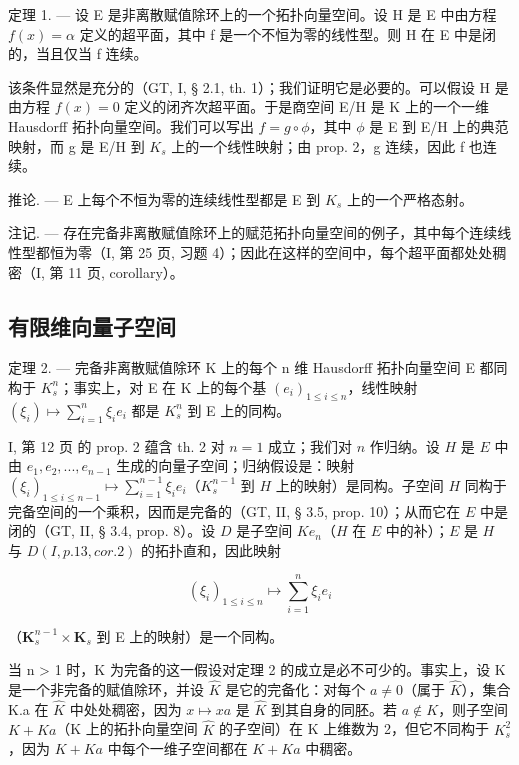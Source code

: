 定理 1. --- 设 E 是非离散赋值除环上的一个拓扑向量空间。设 H 是 E 中由方程 \(f(x) = \alpha\) 定义的超平面，其中 f 是一个不恒为零的线性型。则 H 在 E 中是闭的，当且仅当 f 连续。

该条件显然是充分的（GT, I, § 2.1, th. 1）；我们证明它是必要的。可以假设 H 是由方程 \(f(x) = 0\) 定义的闭齐次超平面。于是商空间 E/H 是 K 上的一个一维 Hausdorff 拓扑向量空间。我们可以写出 \(f = g \circ \phi\)，其中 \(\phi\) 是 E 到 E/H 上的典范映射，而 g 是 E/H 到 \(K_{s}\) 上的一个线性映射；由 prop. 2，g 连续，因此 f 也连续。

推论. --- E 上每个不恒为零的连续线性型都是 E 到 \(K_{s}\) 上的一个严格态射。

注记. --- 存在完备非离散赋值除环上的赋范拓扑向量空间的例子，其中每个连续线性型都恒为零（I, 第 25 页, 习题 4）；因此在这样的空间中，每个超平面都处处稠密（I, 第 11 页, corollary）。

\subsection{有限维向量子空间}

定理 2. --- 完备非离散赋值除环 K 上的每个 n 维 Hausdorff 拓扑向量空间 E 都同构于 \(K_{s}^{n}\)；事实上，对 E 在 K 上的每个基 \((e_{i})_{1\leqslant i\leqslant n}\)，线性映射 \((\xi_{i})\mapsto\sum_{i=1}^{n}\xi_{i}e_{i}\) 都是 \(K_{s}^{n}\) 到 E 上的同构。

I, 第 12 页 的 prop. 2 蕴含 th. 2 对 \(n = 1\) 成立；我们对 \(n\) 作归纳。设 \(H\) 是 \(E\) 中由 \(e_1, e_2, ..., e_{n-1}\) 生成的向量子空间；归纳假设是：映射 \((\xi_i)_{1 \leqslant i \leqslant n-1} \mapsto \sum_{i=1}^{n-1} \xi_i e_i\)（\(K_s^{n-1}\) 到 \(H\) 上的映射）是同构。子空间 \(H\) 同构于完备空间的一个乘积，因而是完备的（GT, II, § 3.5, prop. 10）；从而它在 \(E\) 中是闭的（GT, II, § 3.4, prop. 8）。设 \(D\) 是子空间 \(K e_n\)（\(H\) 在 \(E\) 中的补）；\(E\) 是 \(H\) 与 \(D(I, p. 13, cor. 2)\) 的拓扑直和，因此映射

\[
\left(\xi_ {i}\right) _ {1 \leqslant i \leqslant n} \mapsto \sum_ {i = 1} ^ {n} \xi_ {i} e _ {i}
\]

（\(\mathbf{K}_s^{n - 1}\times \mathbf{K}_s\) 到 E 上的映射）是一个同构。

当 n \textgreater{} 1 时，K 为完备的这一假设对定理 2 的成立是必不可少的。事实上，设 K 是一个非完备的赋值除环，并设 \(\hat{K}\) 是它的完备化：对每个 \(a \neq 0\)（属于 \(\hat{K}\)），集合 K.a 在 \(\hat{K}\) 中处处稠密，因为 \(x \mapsto xa\) 是 \(\hat{K}\) 到其自身的同胚。若 \(a \notin K\)，则子空间 \(K + Ka\)（K 上的拓扑向量空间 \(\hat{K}\) 的子空间）在 K 上维数为 2，但它不同构于 \(K_{s}^{2}\)，因为 \(K + Ka\) 中每个一维子空间都在 \(K + Ka\) 中稠密。

